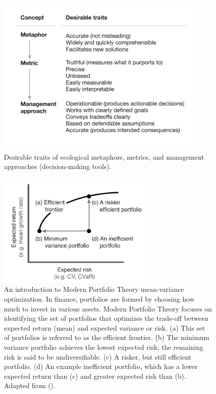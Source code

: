 \begin{figure}[htbp]
\centering
\includegraphics[width=4in]{mmm-traits.pdf}
\caption{
Desirable traits of ecological metaphors, metrics, and management approaches
(decision-making tools).
}
\label{fig:traits}
\end{figure}

\clearpage

\begin{figure}[htbp]
\centering
\includegraphics[width=3in]{efficient-frontier-fig.pdf}
\caption{
An introduction to Modern Portfolio Theory mean-variance optimization. In
finance, portfolios are formed by choosing how much to invest in various
assets. Modern Portfolio Theory focuses on identifying the set of portfolios
that optimizes the trade-off between expected return (mean) and expected
variance or risk. (a) This set of portfolios is referred to as the efficient
frontier. (b) The minimum variance portfolio achieves the lowest expected
risk; the remaining risk is said to be undiversifiable. (c) A risker, but
still efficient portfolio. (d) An example inefficient portfolio, which has a
lower expected return than (c) and greater expected risk than (b). Adapted
from \citeauthor{hoekstra2012} (\citeyear{hoekstra2012}).
}
\label{fig:mpt}
\end{figure}

